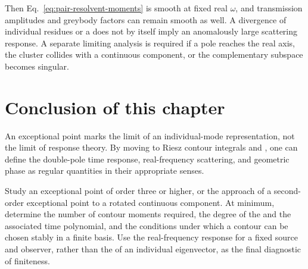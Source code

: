 Then Eq.~\eqref{eq:pair-resolvent-moments} is smooth at fixed real $\omega$, and transmission amplitudes and greybody factors can remain smooth as well. A divergence of individual residues or a  does not by itself imply an anomalously large scattering response. A separate limiting analysis is required if a pole reaches the real axis, the cluster collides with a continuous component, or the complementary subspace becomes singular.

\section{Conclusion of this chapter}

An exceptional point marks the limit of an individual-mode representation, not the limit of response theory. By moving to Riesz contour integrals and , one can define the double-pole time response, real-frequency scattering, and geometric phase as regular quantities in their appropriate senses.

\begin{researchproblem}
Study an exceptional point of order three or higher, or the approach of a second-order exceptional point to a rotated continuous component. At minimum, determine the number of contour moments required, the degree of the  and the associated time polynomial, and the conditions under which a contour can be chosen stably in a finite basis. Use the real-frequency response for a fixed source and observer, rather than the  of an individual eigenvector, as the final diagnostic of finiteness.
\end{researchproblem}
